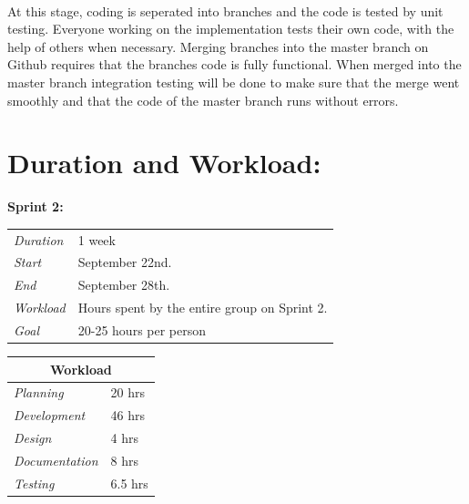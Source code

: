 \paragraph{} At this stage, coding is seperated into branches and the code is tested by unit testing. Everyone working on the implementation tests their own code, with the help of others when necessary. Merging branches into the master branch on Github requires that the branches code is fully functional. When merged into the master branch integration testing will be done to make sure that the merge went smoothly and that the code of the master branch runs without errors. 

\section{Duration and Workload:}

\begin{minipage}{\linewidth}
\centering
\setlength{\tabcolsep}{22pt}
\textbf{Sprint 2:} 
\smallskip
{}
\begin{tabular}{ |l l| }
	\hline
	\it{Duration} & 1 week \\
	\it{Start} & September 22nd. \\
	\it{End} & September 28th. \\
	\it{Workload} & Hours spent by the entire group on Sprint 2. \\
	\it{Goal} & 20-25 hours per person \\
	\hline
\end{tabular}
\end{minipage}

\bigskip

\begin{minipage}{\linewidth}
\setlength{\tabcolsep}{25pt}
\centering
{}
\begin{tabular}{ |l|l| }
	\hline
	\multicolumn{2}{|c|}{\cellcolor{gray!25} Workload} \\
	\hline
	\it{Planning} & 20 hrs\\
	\it{Development} & 46 hrs \\
	\it{Design} & 4 hrs \\
	\it{Documentation} & 8 hrs \\
	\it{Testing} & 6.5 hrs \\
	\hline
\end{tabular}
\end{minipage}

